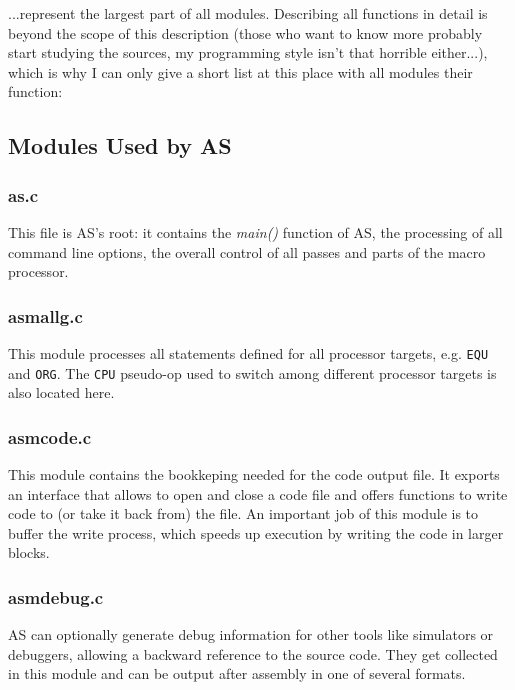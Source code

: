 \documentclass[12pt,twoside]{report}
\newcommand{\tty}[1]{{\tt #1}}
\newcommand{\asname}{{AS}}
\begin{document}
...represent the largest part of all modules.  Describing all functions in
detail is beyond the scope of this description (those who want to know
more probably start studying the sources, my programming style isn't that
horrible either...), which is why I can only give a short list at this
place with all modules their function:

\subsection{Modules Used by \asname{}}

\subsubsection{as.c}

This file is \asname{}'s root: it contains the {\em main()} function of \asname{}, the
processing of all command line options, the overall control of all passes
and parts of the macro processor.

\subsubsection{asmallg.c}

This module processes all statements defined for all processor targets,
e.g. \tty{EQU} and \tty{ORG}.  The \tty{CPU} pseudo-op used to switch
among different processor targets is also located here.

\subsubsection{asmcode.c}

This module contains the bookkeping needed for the code output file.  It
exports an interface that allows to open and close a code file and offers
functions to write code to (or take it back from) the file.  An important
job of this module is to buffer the write process, which speeds up
execution by writing the code in larger blocks.

\subsubsection{asmdebug.c}

\asname{} can optionally generate debug information for other tools like
simulators or debuggers, allowing a backward reference to the source code.
They get collected in this module and can be output after assembly in one
of several formats.
\end{document}
